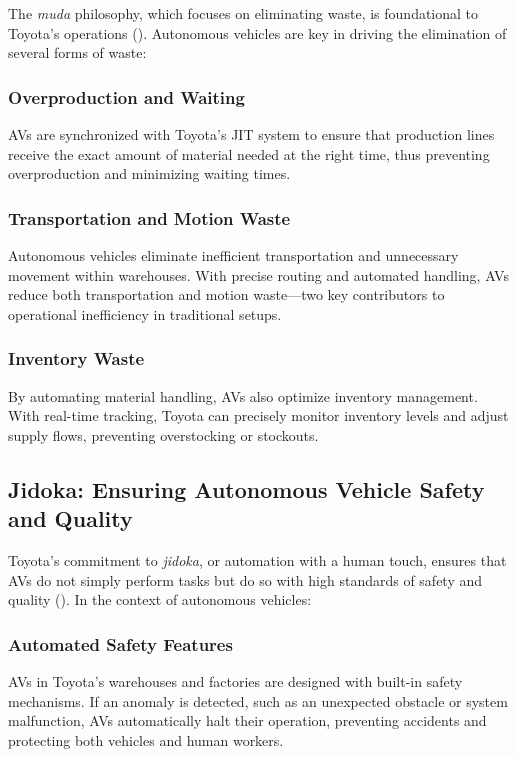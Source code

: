 The \textit{muda} philosophy, which focuses on eliminating waste, is foundational to Toyota’s operations (\cite{Clifford_2021}). Autonomous vehicles are key in driving the elimination of several forms of waste:

\subsubsection{Overproduction and Waiting}
AVs are synchronized with Toyota’s JIT system to ensure that production lines receive the exact amount of material needed at the right time, thus preventing overproduction and minimizing waiting times.

\subsubsection{Transportation and Motion Waste}
Autonomous vehicles eliminate inefficient transportation and unnecessary movement within warehouses. With precise routing and automated handling, AVs reduce both transportation and motion waste—two key contributors to operational inefficiency in traditional setups.

\subsubsection{Inventory Waste}
By automating material handling, AVs also optimize inventory management. With real-time tracking, Toyota can precisely monitor inventory levels and adjust supply flows, preventing overstocking or stockouts.

\subsection{Jidoka: Ensuring Autonomous Vehicle Safety and Quality}

Toyota’s commitment to \textit{jidoka}, or automation with a human touch, ensures that AVs do not simply perform tasks but do so with high standards of safety and quality (\cite{Clifford_2021}). In the context of autonomous vehicles:

\subsubsection{Automated Safety Features}
AVs in Toyota’s warehouses and factories are designed with built-in safety mechanisms. If an anomaly is detected, such as an unexpected obstacle or system malfunction, AVs automatically halt their operation, preventing accidents and protecting both vehicles and human workers.

